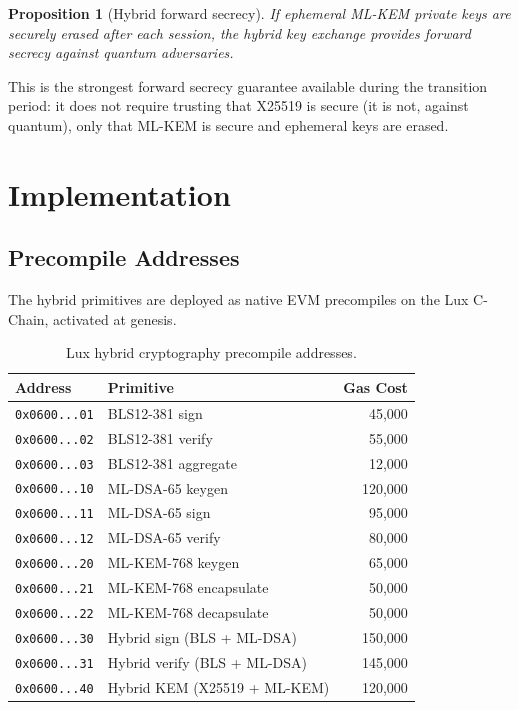 \documentclass[11pt,a4paper]{article}
\newtheorem{proposition}[theorem]{Proposition}
\begin{document}
\begin{proposition}[Hybrid forward secrecy]
If ephemeral ML-KEM private keys are securely erased after each session, the hybrid
key exchange provides forward secrecy against quantum adversaries.
\end{proposition}

This is the strongest forward secrecy guarantee available during the transition
period: it does not require trusting that X25519 is secure (it is not, against
quantum), only that ML-KEM is secure and ephemeral keys are erased.

\section{Implementation}
\label{sec:implementation}

\subsection{Precompile Addresses}

The hybrid primitives are deployed as native EVM precompiles on the Lux C-Chain,
activated at genesis.

\begin{table}[ht]
\centering
\caption{Lux hybrid cryptography precompile addresses.}
\label{tab:precompiles}
\begin{tabular}{llr}
\toprule
\textbf{Address} & \textbf{Primitive} & \textbf{Gas Cost} \\
\midrule
\texttt{0x0600...01} & BLS12-381 sign & 45{,}000 \\
\texttt{0x0600...02} & BLS12-381 verify & 55{,}000 \\
\texttt{0x0600...03} & BLS12-381 aggregate & 12{,}000 \\
\texttt{0x0600...10} & ML-DSA-65 keygen & 120{,}000 \\
\texttt{0x0600...11} & ML-DSA-65 sign & 95{,}000 \\
\texttt{0x0600...12} & ML-DSA-65 verify & 80{,}000 \\
\texttt{0x0600...20} & ML-KEM-768 keygen & 65{,}000 \\
\texttt{0x0600...21} & ML-KEM-768 encapsulate & 50{,}000 \\
\texttt{0x0600...22} & ML-KEM-768 decapsulate & 50{,}000 \\
\texttt{0x0600...30} & Hybrid sign (BLS + ML-DSA) & 150{,}000 \\
\texttt{0x0600...31} & Hybrid verify (BLS + ML-DSA) & 145{,}000 \\
\texttt{0x0600...40} & Hybrid KEM (X25519 + ML-KEM) & 120{,}000 \\
\bottomrule
\end{tabular}
\end{table}
\end{document}
